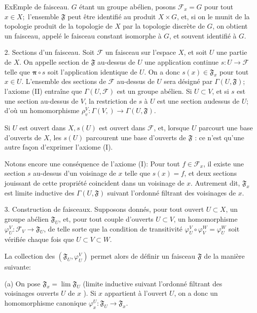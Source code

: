 ExEmple de faisceau. $G$ étant un groupe abélien, posons $\mathcal{F}_{x}=G$ pour tout $x \in X ;$ l'ensemble $\mathfrak{F}$ peut être identifié au produit $X \times G$, et, si on le munit de la topologie produit de la topologie de $X$ par la topologie discrète de $G$, on obtient un faisceau, appelé le faisceau constant isomorphe à $G$, et souvent identifié à $G$.

2. Sections d'un faisceau. Soit $\mathcal{F}$ un faisceau sur l'espace $X$, et soit $U$ une partie de $X$. On appelle section de $\mathfrak{F}$ au-dessus de $U$ une application continue $s: U \rightarrow \mathcal{F}$ telle que $\boldsymbol{\pi} \circ s$ soit l'application identique de $U$. On a donc $s(x) \in \mathfrak{F}_{x}$ pour tout $x \in U$. L'ensemble des sections de $\mathcal{F}$ au-dessus de $U$ sera désigné par $\Gamma(U, \mathfrak{F})$; l'axiome (II) entraîne que $\Gamma(U, \mathcal{F})$ est un groupe abélien. Si $U \subset V$, et si $s$ est une section au-dessus de $V$, la restriction de $s$ à $U$ est une section audessus de $U$; d'où un homomorphisme $\rho_{v}^{V}: \Gamma(V, \mathfrak{}) \rightarrow \Gamma(U, \mathfrak{F})$.

Si $U$ est ouvert dans $X, s(U)$ est ouvert dans $\mathcal{F}$, et, lorsque $U$ parcourt une base d'ouverts de $X$, les $s(U)$ parcourent une base d'ouverts de $\mathfrak{F}$ : ce n'est qu'une autre façon d'exprimer l'axiome (I).

Notons encore une conséquence de l'axiome (I): Pour tout $f \in \mathcal{F}_{x}$, il existe une section $s$ au-dessus d'un voisinage de $x$ telle que $s(x)=f$, et deux sections jouissant de cette propriété coincident dans un voisinage de $x$. Autrement dit, $\mathfrak{F}_{x}$ est limite inductive des $\Gamma(U, \mathfrak{F})$ suivant l'ordonné filtrant des voisinages de $x$.

3. Construction de faisceaux. Supposons donnés, pour tout ouvert $U \subset X$, un groupe abélien $\mathfrak{F}_{U}$, et, pour tout couple d'ouverts $U \subset V$, un homomorphisme $\varphi_{U}^{V}: \mathscr{F}_{V} \rightarrow \mathfrak{F}_{U}$, de telle sorte que la condition de transitivité $\varphi_{U}^{V} \circ \varphi_{V}^{W}=\varphi_{U}^{W}$ soit vérifiée chaque fois que $U \subset V \subset W$.

La collection des $\left(\mathfrak{F}_{U}, \varphi_{U}^{V}\right)$ permet alors de définir un faisceau $\mathfrak{F}$ de la manière suivante:

(a) On pose $\mathfrak{F}_{x}=\lim \mathfrak{F}_{U}$ (limite inductive suivant l'ordonné filtrant des voisinages ouverts $U$ de $x$ ). Si $x$ appartient à l'ouvert $U$, on a donc un homomorphisme canonique $\varphi_{x}^{U}: \mathfrak{F}_{U} \rightarrow \mathfrak{F}_{x}$.

